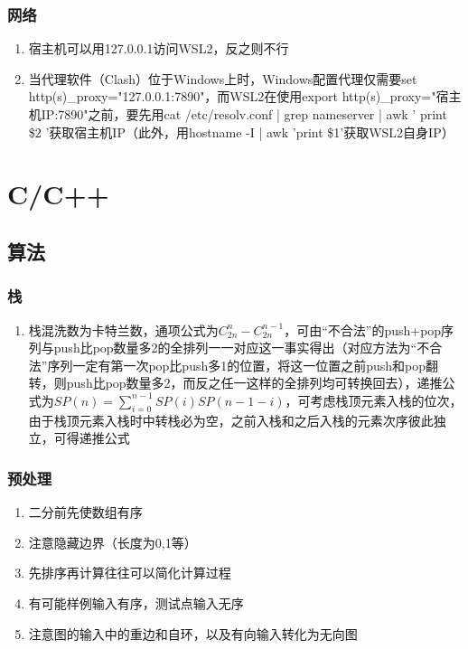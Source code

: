 \documentclass[onecolumn]{article}
\begin{document}
        \subsubsection{网络}
            \noindent
            \begin{enumerate}
                \item 宿主机可以用127.0.0.1访问WSL2，反之则不行
                \item 当代理软件（Clash）位于Windows上时，Windows配置代理仅需要set http(s)\_proxy="127.0.0.1:7890"，而WSL2在使用export http(s)\_proxy="宿主机IP:7890"之前，要先用cat /etc/resolv.conf | grep nameserver | awk '{ print \$2 }'获取宿主机IP（此外，用hostname -I | awk '{print \$1}'获取WSL2自身IP）
            \end{enumerate}
\newpage
\section{C/C++}
    \subsection{算法}
        \subsubsection{栈}
            \noindent
            \begin{enumerate}
                \item 栈混洗数为卡特兰数，通项公式为$C_{2n}^n-C_{2n}^{n-1}$，可由“不合法”的push+pop序列与push比pop数量多2的全排列一一对应这一事实得出（对应方法为“不合法”序列一定有第一次pop比push多1的位置，将这一位置之前push和pop翻转，则push比pop数量多2，而反之任一这样的全排列均可转换回去），递推公式为$SP(n)=\sum_{i=0}^{n-1}SP(i)SP(n-1-i)$，可考虑栈顶元素入栈的位次，由于栈顶元素入栈时中转栈必为空，之前入栈和之后入栈的元素次序彼此独立，可得递推公式
            \end{enumerate}
        \subsubsection{预处理}
            \noindent
            \begin{enumerate}
                \item 二分前先使数组有序
                \item 注意隐藏边界（长度为0,1等）
                \item 先排序再计算往往可以简化计算过程
                \item 有可能样例输入有序，测试点输入无序
                \item 注意图的输入中的重边和自环，以及有向输入转化为无向图
            \end{enumerate}
\end{document}
